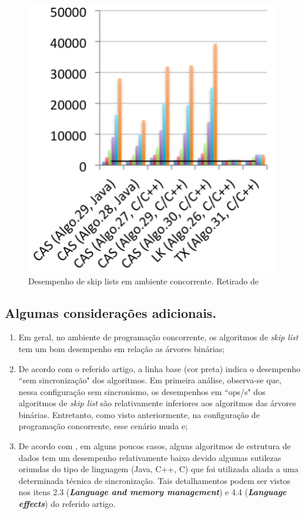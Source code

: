 \documentclass[paper=a4, fontsize=11pt]{scrartcl} %
\numberwithin{equation}{section}
\numberwithin{figure}{section}
\numberwithin{table}{section}
\numberwithin{definition}{section}
\numberwithin{theorem}{section}
\numberwithin{property}{section}
\numberwithin{proposition}{section}
\begin{document}
\begin{figure}[htpb]
  \includegraphics[scale=0.48]{SL.png}
  \caption{Desempenho de skip lists em ambiente concorrente. Retirado de \cite{Gramoli2015more}}
\end{figure}

\pagebreak

\subsection{Algumas considera\c{c}\~{o}es adicionais.} 

\begin{enumerate}

\item Em geral, no ambiente de programa\c{c}\~{a}o concorrente, os algoritmos de \textit{skip list } tem um bom desempenho em rela\c{c}\~{a}o as \'{a}rvores bin\'{a}rias;
\item De acordo com o referido artigo, a linha base (cor preta) indica o desempenho ``sem sincroniza\c{c}\~{a}o" dos algoritmos. Em primeira an\'{a}lise, observa-se que, nessa configura\c{c}\~{a}o sem sincronismo, os desempenhos em ``ops/s" dos algoritmos de \textit{skip list } s\~{a}o relativamente inferiores aos algoritmos das \'{a}rvores bin\'{a}rias. Entretanto, como visto anteriormente, na configura\c{c}\~{a}o de programa\c{c}\~{a}o concorrente, esse cen\'{a}rio muda e;
\item De acordo com \cite{Gramoli2015more}, em alguns poucos casos, alguns algoritmos de estrutura de dados  tem um desempenho relativamente baixo devido algumas sutilezas oriundas do tipo de linguagem (Java, C++, C) que foi utilizada aliada a uma determinada t\'{e}cnica de sincroniza\c{c}\~{a}o. Tais detalhamentos podem ser vistos nos itens 2.3 (\textbf{\textit{Language and memory management}}) e 4.4 (\textbf{\textit{Language effects}}) do referido artigo. 
 
\end{enumerate}
\end{document}
